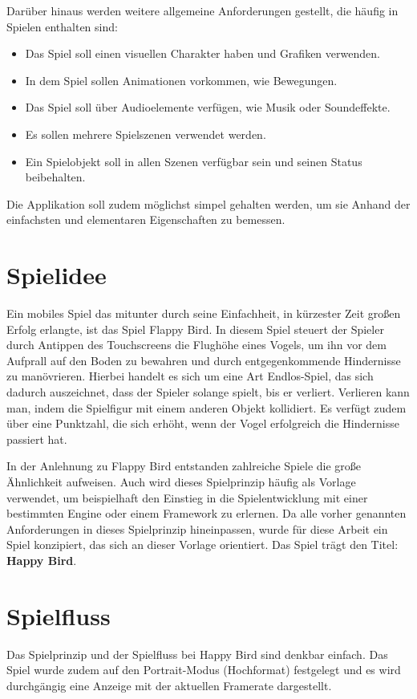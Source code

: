 Darüber hinaus werden weitere allgemeine Anforderungen gestellt, die häufig in Spielen enthalten sind:

\begin{itemize}
	\item Das Spiel soll einen visuellen Charakter haben und Grafiken verwenden.
	\item In dem Spiel sollen Animationen vorkommen, wie Bewegungen. 
	\item Das Spiel soll über Audioelemente verfügen, wie Musik oder Soundeffekte.
	\item Es sollen mehrere Spielszenen verwendet werden.
	\item Ein Spielobjekt soll in allen Szenen verfügbar sein und seinen Status beibehalten.
\end{itemize}

Die Applikation soll zudem möglichst simpel gehalten werden, um sie Anhand der einfachsten und elementaren Eigenschaften zu bemessen.


\section{Spielidee}
Ein mobiles Spiel das mitunter durch seine Einfachheit, in kürzester Zeit großen Erfolg erlangte, ist das Spiel Flappy Bird. \citep{flappy_bird}
In diesem Spiel steuert der Spieler durch Antippen des Touchscreens die Flughöhe eines Vogels, um ihn vor dem Aufprall auf den Boden zu bewahren und durch entgegenkommende Hindernisse zu manövrieren. Hierbei handelt es sich um eine Art Endlos-Spiel, das sich dadurch auszeichnet, dass der Spieler solange spielt, bis er verliert. Verlieren kann man, indem die Spielfigur mit einem anderen Objekt kollidiert. Es verfügt zudem über eine Punktzahl, die sich erhöht, wenn der Vogel erfolgreich die Hindernisse passiert hat.

\bigskip
In der Anlehnung zu Flappy Bird entstanden zahlreiche Spiele die große Ähnlichkeit aufweisen. Auch wird dieses Spielprinzip häufig als Vorlage verwendet, um beispielhaft den Einstieg in die Spielentwicklung mit einer bestimmten Engine oder einem Framework zu erlernen. Da alle vorher genannten Anforderungen in dieses Spielprinzip hineinpassen, wurde für diese Arbeit ein Spiel konzipiert, das sich an dieser Vorlage orientiert. Das Spiel trägt den Titel: \textbf{Happy Bird}. 

\section{Spielfluss}
Das Spielprinzip und der Spielfluss bei Happy Bird sind denkbar einfach. Das Spiel wurde zudem auf den Portrait-Modus (Hochformat) festgelegt und es wird durchgängig eine Anzeige mit der aktuellen Framerate dargestellt.


